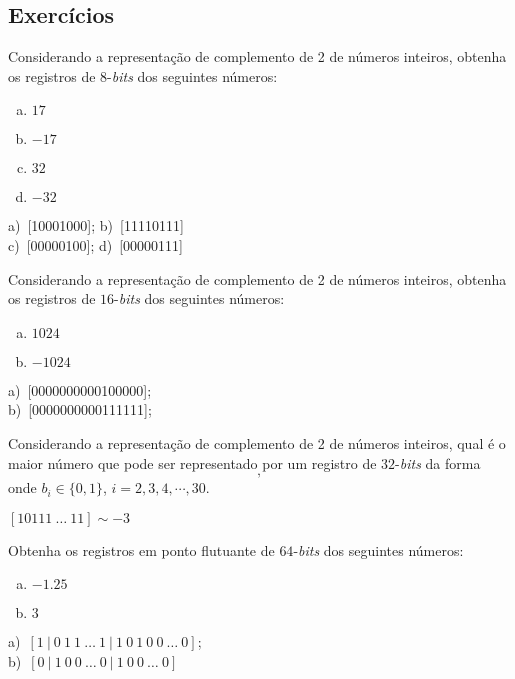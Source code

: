 \subsection{Exercícios}

\begin{exer}
  Considerando a representação de complemento de 2 de números inteiros, obtenha os registros de $8$-{\it bits} dos seguintes números:
  \begin{enumerate}[a)]
  \item $17$
  \item $-17$
  \item $32$
  \item $-32$
  \end{enumerate}
\end{exer}
\begin{resp}
  a)~[10001000]; b)~[11110111]\\
  c)~[00000100]; d)~[00000111]
\end{resp}

\begin{exer}
  Considerando a representação de complemento de 2 de números inteiros, obtenha os registros de $16$-{\it bits} dos seguintes números:
  \begin{enumerate}[a)]
  \item $1024$
  \item $-1024$
  \end{enumerate}
\end{exer}
\begin{resp}
    a)~[0000000000100000]; \\
    b)~[0000000000111111];
\end{resp}

\begin{exer}
  Considerando a representação de complemento de 2 de números inteiros, qual é o maior número que pode ser representado por um registro de $32$-{\it bits} da forma
  \begin{equation}
    [1 ~ 0 ~ b_2 ~ b_3 ~ b_4 ~ \cdots ~ b_{30} ~ 1],
  \end{equation}
onde $b_i \in \{0, 1\}$, $i=2, 3, 4, \cdots, 30$.
\end{exer}
\begin{resp}
  $[10111~\ldots~11] \sim -3$
\end{resp}

\begin{exer}
  Obtenha os registros em ponto flutuante de $64$-{\it bits} dos seguintes números:
  \begin{enumerate}[a)]
  \item $-1.25$
  \item $3$
  \end{enumerate}
\end{exer}
\begin{resp}
    a)~$[1 ~ | ~ 0 ~ 1 ~ 1 ~ \ldots ~ 1 ~ | ~ 1 ~ 0 ~ 1 ~ 0 ~ 0 ~ \ldots ~ 0]$;\\
    b)~$[0 ~ | ~ 1 ~ 0 ~ 0 ~ \ldots ~ 0 ~ | ~ 1 ~ 0 ~ 0 ~ \ldots ~ 0]$
\end{resp}

